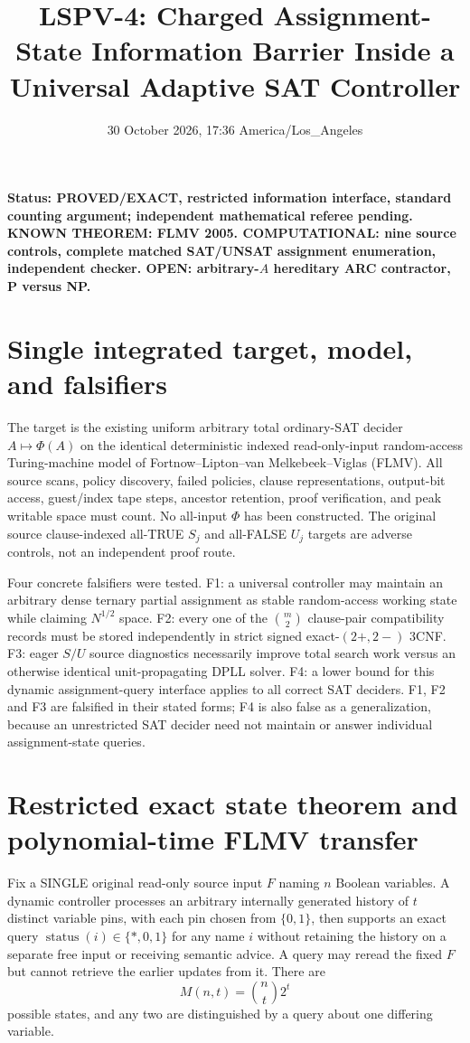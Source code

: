 \documentclass[11pt]{article}
\title{LSPV-4: Charged Assignment-State Information Barrier Inside a Universal Adaptive SAT Controller}
\date{30 October 2026, 17:36 America/Los\_Angeles}
\begin{document}
\maketitle
\noindent\textbf{Status: PROVED/EXACT, restricted information interface, standard counting argument; independent mathematical referee pending. KNOWN THEOREM: FLMV 2005. COMPUTATIONAL: nine source controls, complete matched SAT/UNSAT assignment enumeration, independent checker. OPEN: arbitrary-$A$ hereditary ARC contractor, P versus NP.}
\section{Single integrated target, model, and falsifiers}
The target is the existing uniform arbitrary total ordinary-SAT decider $A\mapsto\Phi(A)$ on the identical deterministic indexed read-only-input random-access Turing-machine model of Fortnow--Lipton--van Melkebeek--Viglas (FLMV). All source scans, policy discovery, failed policies, clause representations, output-bit access, guest/index tape steps, ancestor retention, proof verification, and peak writable space must count. No all-input $\Phi$ has been constructed. The original source clause-indexed all-TRUE $S_j$ and all-FALSE $U_j$ targets are adverse controls, not an independent proof route.

Four concrete falsifiers were tested. F1: a universal controller may maintain an arbitrary dense ternary partial assignment as stable random-access working state while claiming $N^{1/2}$ space. F2: every one of the $\binom m2$ clause-pair compatibility records must be stored independently in strict signed exact-$(2+,2-)$ 3CNF. F3: eager $S/U$ source diagnostics necessarily improve total search work versus an otherwise identical unit-propagating DPLL solver. F4: a lower bound for this dynamic assignment-query interface applies to all correct SAT deciders. F1, F2 and F3 are falsified in their stated forms; F4 is also false as a generalization, because an unrestricted SAT decider need not maintain or answer individual assignment-state queries.

\section{Restricted exact state theorem and polynomial-time FLMV transfer}
Fix a SINGLE original read-only source input $F$ naming $n$ Boolean variables. A dynamic controller processes an arbitrary internally generated history of $t$ distinct variable pins, with each pin chosen from $\{0,1\}$, then supports an exact query $\operatorname{status}(i)\in\{*,0,1\}$ for any name $i$ without retaining the history on a separate free input or receiving semantic advice. A query may reread the fixed $F$ but cannot retrieve the earlier updates from it. There are
\[
M(n,t)=\binom nt2^t
\]
possible states, and any two are distinguished by a query about one differing variable.
\end{document}
